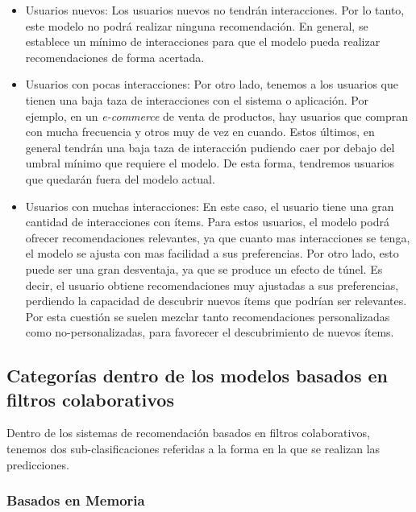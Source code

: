 \documentclass[11pt,a4paper,twoside]{thesis}
\begin{document}
\begin{itemize}
	\item Usuarios nuevos: Los usuarios nuevos no tendrán interacciones. Por lo tanto,
	      este modelo no podrá realizar ninguna recomendación. En general, se establece
	      un mínimo de interacciones para que el modelo pueda realizar recomendaciones de
	      forma acertada.
	\item Usuarios con pocas interacciones: Por otro lado, tenemos a los usuarios que
	      tienen una baja taza de interacciones con el sistema o aplicación. Por ejemplo,
	      en un \textit{e-commerce} de venta de productos, hay usuarios que compran con
	      mucha frecuencia y otros muy de vez en cuando. Estos últimos, en general
	      tendrán una baja taza de interacción pudiendo caer por debajo del umbral mínimo
	      que requiere el modelo. De esta forma, tendremos usuarios que quedarán fuera
	      del modelo actual.
	\item Usuarios con muchas interacciones: En este caso, el usuario tiene una gran
	      cantidad de interacciones con ítems. Para estos usuarios, el modelo podrá
	      ofrecer recomendaciones relevantes, ya que cuanto mas interacciones se tenga,
	      el modelo se ajusta con mas facilidad a sus preferencias. Por otro lado, esto
	      puede ser una gran desventaja, ya que se produce un efecto de túnel. Es decir,
	      el usuario obtiene recomendaciones muy ajustadas a sus preferencias, perdiendo
	      la capacidad de descubrir nuevos ítems que podrían ser relevantes. Por esta
	      cuestión se suelen mezclar tanto recomendaciones personalizadas como
	      no-personalizadas, para favorecer el descubrimiento de nuevos ítems.

\end{itemize}

\subsection{Categorías dentro de los modelos basados en filtros colaborativos}

Dentro de los sistemas de recomendación basados en filtros colaborativos,
tenemos dos sub-clasificaciones referidas a la forma en la que se realizan las
predicciones.

\subsubsection{Basados en Memoria}
\end{document}

